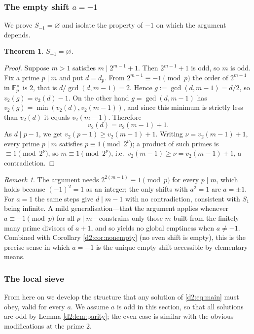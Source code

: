 \documentclass[a4paper]{article}
\theoremstyle{plain}
\newtheorem{theorem}{Theorem}[subsection]
\theoremstyle{definition}
\theoremstyle{remark}
\newtheorem{remark}{Remark}[subsection]
\newcommand{\F}{\mathbb{F}}
\newcommand{\dvd}{\mid}
\begin{document}
\subsubsection{The empty shift $a=-1$}

We prove $S_{-1}=\varnothing$ and isolate the property of $-1$ on which the argument depends.

\begin{theorem}\label{d2:thm:minusone}
$S_{-1}=\varnothing$.
\end{theorem}

\begin{proof}
Suppose $m>1$ satisfies $m\dvd2^{m-1}+1$. Then $2^{m-1}+1$ is odd, so $m$ is odd. Fix a prime $p\dvd m$ and put $d=d_p$. From $2^{m-1}\equiv-1\pmod p$ the order of $2^{m-1}$ in $\F_p^{\times}$ is $2$, that is $d/\gcd(d,m-1)=2$. Hence $g:=\gcd(d,m-1)=d/2$, so $v_2(g)=v_2(d)-1$. On the other hand $g=\gcd(d,m-1)$ has $v_2(g)=\min(v_2(d),v_2(m-1))$, and since this minimum is strictly less than $v_2(d)$ it equals $v_2(m-1)$. Therefore
\[
v_2(d)=v_2(m-1)+1.
\]
As $d\dvd p-1$, we get $v_2(p-1)\ge v_2(m-1)+1$. Writing $\nu=v_2(m-1)+1$, every prime $p\dvd m$ satisfies $p\equiv1\pmod{2^{\nu}}$; a product of such primes is $\equiv1\pmod{2^{\nu}}$, so $m\equiv1\pmod{2^{\nu}}$, i.e.\ $v_2(m-1)\ge\nu=v_2(m-1)+1$, a contradiction.
\end{proof}

\begin{remark}\label{d2:rem:whyminusone}
The argument needs $2^{2(m-1)}\equiv1\pmod p$ for every $p\dvd m$, which holds because $(-1)^{2}=1$ as an integer; the only shifts with $a^{2}=1$ are $a=\pm1$. For $a=1$ the same steps give $d\dvd m-1$ with no contradiction, consistent with $S_1$ being infinite. A mild generalisation---that the argument applies whenever $a\equiv-1\pmod p$ for all $p\dvd m$---constrains only those $m$ built from the finitely many prime divisors of $a+1$, and so yields no global emptiness when $a\ne-1$. Combined with Corollary \ref{d2:cor:nonempty} (no even shift is empty), this is the precise sense in which $a=-1$ is the unique empty shift accessible by elementary means.
\end{remark}

\subsubsection{The local sieve}\label{d2:sec:sieve}

From here on we develop the structure that any solution of \eqref{d2:eq:main} must obey, valid for every $a$. We assume $a$ is odd in this section, so that all solutions are odd by Lemma \ref{d2:lem:parity}; the even case is similar with the obvious modifications at the prime $2$.
\end{document}
